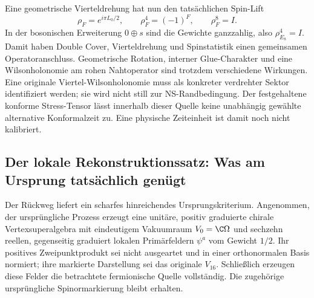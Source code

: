 Eine geometrische Vierteldrehung hat nun den tatsächlichen Spin-Lift
\begin{equation}
\rho_F=e^{i\pi L_0/2},\qquad \rho_F^4=(-1)^F,\qquad \rho_F^8=I.
\end{equation}
In der bosonischen Erweiterung $0\oplus s$ sind die Gewichte ganzzahlig, also $\rho_{E_8}^4=I$. Damit haben Double Cover, Vierteldrehung und Spinstatistik einen gemeinsamen Operatoranschluss. Geometrische Rotation, interner Glue-Charakter und eine Wilsonholonomie am rohen Nahtoperator sind trotzdem verschiedene Wirkungen. Eine originale Viertel-Wilsonholonomie muss als konkreter verdrehter Sektor identifiziert werden; sie wird nicht still zur NS-Randbedingung. Der festgehaltene konforme Stress-Tensor lässt innerhalb dieser Quelle keine unabhängig gewählte alternative Konformalzeit zu. Eine physische Zeiteinheit ist damit noch nicht kalibriert.

\subsection{Der lokale Rekonstruktionssatz: Was am Ursprung tatsächlich genügt}\label{sec:originkernelcriterion}
Der Rückweg liefert ein scharfes hinreichendes Ursprungskriterium. Angenommen, der ursprüngliche Prozess erzeugt eine unitäre, positiv graduierte chirale Vertexsuperalgebra mit eindeutigem Vakuumraum $V_0=\C\Omega$ und sechzehn reellen, gegenseitig graduiert lokalen Primärfeldern $\psi^a$ vom Gewicht $1/2$. Ihr positives Zweipunktprodukt sei nicht ausgeartet und in einer orthonormalen Basis normiert; ihre markierte Darstellung sei das originale $V_{16}$. Schließlich erzeugen diese Felder die betrachtete fermionische Quelle vollständig. Die zugehörige ursprüngliche Spinormarkierung bleibt erhalten.

